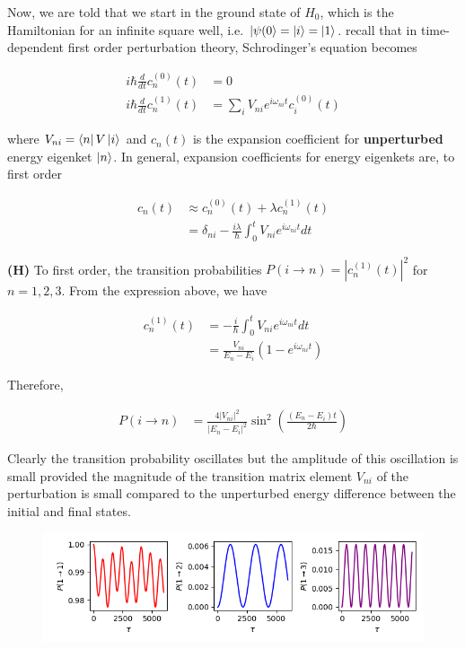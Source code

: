 \documentclass[12pt]{article}
\theoremstyle{definition}
\begin{document}
{Now, we are told that we start in the ground state of $H_{0}$, which is the Hamiltonian for an infinite square well, i.e. $\ket{\psi(0} = \ket{i} = \ket{1}$. recall that in time-dependent first order perturbation theory, Schrodinger's equation becomes

\begin{align*}
i\hbar\frac{d}{dt}c_{n}^{(0)}(t) &= 0\\
i\hbar\frac{d}{dt}c_{n}^{(1)}(t) &= \sum_{i}V_{ni}e^{i\omega_{ni}t}c_{i}^{(0)}(t)
\end{align*}

where $V_{ni} = \bra{n}V\ket{i}$ and $c_{n}(t)$ is the expansion coefficient for \textbf{unperturbed} energy eigenket $\ket{n}$. In general, expansion coefficients for energy eigenkets are, to first order

\begin{align*}
c_{n}(t) &\approx c_{n}^{(0)}(t) + \lambda c_{n}^{(1)}(t)\\
&= \delta_{ni} - \frac{i\lambda}{\hbar}\int_{0}^{t}V_{ni}e^{i\omega_{ni}t}dt
\end{align*}


\noindent \textbf{(H)} To first order, the transition probabilities $P(i\rightarrow n) = |c_{n}^{(1)}(t)|^{2}$ for $n=1,2,3$. From the expression above, we have

\begin{align*}
c_{n}^{(1)}(t) &= -\frac{i}{\hbar}\int_{0}^{t}V_{ni} e^{i\omega_{ni}t}dt\\
&= \frac{V_{ni}}{E_{n}-E_{i}}(1-e^{i\omega_{ni}t})
\end{align*}

Therefore,

\begin{align*}
P(i\rightarrow n) &= \frac{4|V_{ni}|^{2}}{|E_{n}-E_{i}|^{2}}\sin^{2}\left(\frac{(E_{n}-E_{i})t}{2\hbar}\right)
\end{align*}

Clearly the transition probability oscillates but the amplitude of this oscillation is small provided the magnitude of the transition matrix element $V_{ni}$ of the perturbation is small compared to the unperturbed energy difference between the initial and final states.
\clearpage

\begin{figure}
\includegraphics[scale=1]{Figure_2.png}
\centering
\caption{}
\end{figure}

}
\end{document}
